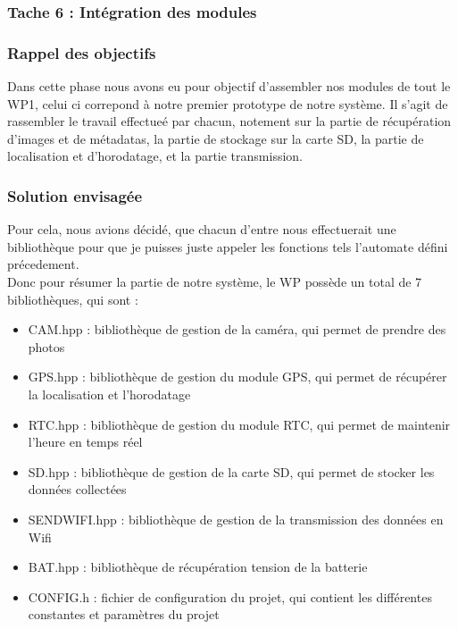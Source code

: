 \subsubsection{Tache 6 : Intégration des modules}

\subsubsection*{Rappel des objectifs}

Dans cette phase nous avons eu pour objectif d'assembler nos modules de tout le WP1, celui ci correpond à notre premier prototype de notre système.
Il s'agit de rassembler le travail effectueé par chacun, notement sur la partie de récupération d'images et de métadatas, 
la partie de stockage sur la carte SD, la partie de localisation et d'horodatage, et la partie transmission.
\\

\subsubsection*{Solution envisagée}

Pour cela, nous avions décidé, que chacun d'entre nous effectuerait une bibliothèque pour que je puisses juste appeler les fonctions tels 
l'automate défini précedement. 
\\

Donc pour résumer la partie de notre système, le WP possède un total de 7 bibliothèques, qui sont :
\begin{itemize}
    \item CAM.hpp : bibliothèque de gestion de la caméra, qui permet de prendre des photos 
    \item GPS.hpp : bibliothèque de gestion du module GPS, qui permet de récupérer la localisation et l'horodatage
    \item RTC.hpp : bibliothèque de gestion du module RTC, qui permet de maintenir l'heure en temps réel
    \item SD.hpp : bibliothèque de gestion de la carte SD, qui permet de stocker les données collectées
    \item SENDWIFI.hpp : bibliothèque de gestion de la transmission des données en Wifi
    \item BAT.hpp : bibliothèque de récupération tension de la batterie
    \item CONFIG.h : fichier de configuration du projet, qui contient les différentes constantes et paramètres du projet
    \\
\end{itemize}

